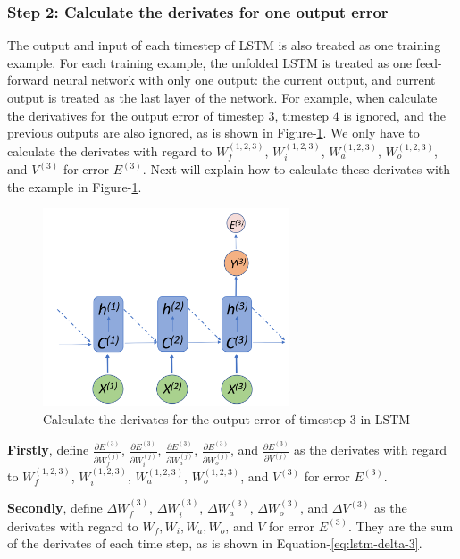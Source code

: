 \documentclass[english]{article}
\begin{document}
\subsubsection{Step 2: Calculate the derivates for one output error}
The output and input of each timestep of LSTM is also treated as one training example. For each training example, the unfolded LSTM is treated as one feed-forward neural network with only one output: the current output, and current output is treated as the last layer of the network.  
For example, when calculate the derivatives for the output error of timestep $3$, timestep $4$  is ignored, and the previous outputs are also ignored, as is shown in Figure-\ref{fig:lstm-one}. We only have to calculate the derivates with regard to $W^{(1,2,3)}_f$, $W^{(1,2,3)}_i$, $W^{(1,2,3)}_a$, $W^{(1,2,3)}_o$, and $V^{(3)}$ for error $E^{(3)}$. Next will explain how to calculate these derivates with the example in Figure-\ref{fig:lstm-one}.

\begin{figure}[htbp]
	\centering
	\includegraphics[width=0.65\textwidth, keepaspectratio]{lstm-one}
	\caption{Calculate the derivates for the output error of timestep 3 in LSTM}
	\label{fig:lstm-one}
\end{figure}


\textbf{Firstly}, define $\frac{\partial E^{(3)}}{\partial W^{(j)}_f}$,  $\frac{\partial E^{(3)}}{\partial W^{(j)}_i}$, $\frac{\partial E^{(3)}}{\partial W^{(j)}_a}$,  $\frac{\partial E^{(3)}}{\partial W^{(j)}_o}$, and $\frac{\partial E^{(3)}}{\partial V^{(j)}}$ as the derivates with regard to $W^{(1,2,3)}_f$, $W^{(1,2,3)}_i$, $W^{(1,2,3)}_a$, $W^{(1,2,3)}_o$, and $V^{(3)}$  for error $E^{(3)}$.

\textbf{Secondly}, define $\Delta W^{(3)}_f$,  $\Delta W^{(3)}_i$, $\Delta W^{(3)}_a$, $\Delta W^{(3)}_o$, and $\Delta V^{(3)}$ 
as the derivates with regard to $W_f, W_i, W_a, W_o$,  and $V$ for error $E^{(3)}$. They are the sum of the derivates of each time step, as is shown in Equation-\ref{eq:lstm-delta-3}.
\end{document}
